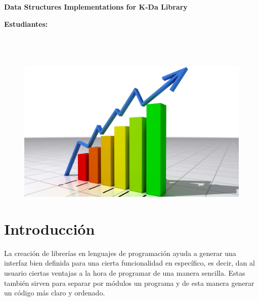 \documentclass[letterpaper]{article}
\begin{document}
\vspace*{2cm}

\begin{center}
\Huge
\textbf{Data Structures Implementations for K-Da Library}
\vspace*{1cm}
\end{center}

\noindent
\small\baselineskip=14pt
\textbf{Estudiantes:} \\
\\
\\
\\


\begin{figure}[ht]
\includegraphics[width=1\linewidth]{ese.jpg}
\end{figure}


\section{Introducción}
\quad \quad La creación de librerías en lenguajes de programación ayuda a generar una interfaz bien definida para una cierta funcionalidad en específico, es decir,
dan al usuario ciertas ventajas a la hora de programar de una manera sencilla. Estas también sirven para separar por módulos un programa y de esta manera generar un código más claro y ordenado.\\
\end{document}

